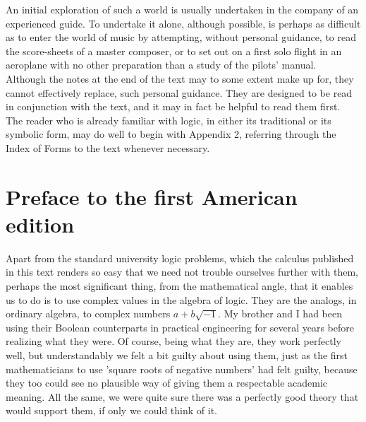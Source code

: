 \documentclass[a4paper]{article}
\theoremstyle{remark}
\begin{document}
An  initial  exploration  of  such  a  world  is  usually  undertaken  in the company  of an  experienced  guide. To  undertake  it  alone, although  possible,  is perhaps as  difficult  as to enter  the world  of  music  by  attempting,  without  personal  guidance,  to  read  the  score-sheets  of  a master  composer,  or  to  set  out  on  a  first  solo  flight  in  an  aeroplane  with  no  other  preparation  than  a  study  of  the  pilots'  manual. \\

Although  the  notes  at  the  end  of the  text  may  to  some  extent  make  up for, they cannot effectively replace,   such   personal   guidance.  They  are  designed  to  be  read  in  conjunction  with  the  text,  and  it  may  in  fact  be  helpful  to  read  them  first. \\

The  reader  who  is  already  familiar  with  logic,  in  either  its  traditional   or  its  symbolic  form,   may  do   well  to   begin   with   Appendix  2,  referring  through  the  Index  of  Forms  to  the  text  whenever  necessary.  \\


\newpage
\section*{Preface to the first American edition}

Apart   from   the   standard   university   logic   problems,   which   the  calculus published  in  this  text  renders  so  easy  that  we  need  not   trouble   ourselves   further   with   them,   perhaps   the   most   significant  thing,  from  the  mathematical  angle,  that  it  enables  us  to  do  is to  use  complex  values  in  the  algebra  of  logic.  They  are  the   analogs,   in  ordinary   algebra,   to   complex   numbers   $a +b \sqrt{-1}$.   My  brother  and  I  had  been  using  their  Boolean  counterparts  in  practical  engineering  for  several  years   before   realizing what  they were.  Of  course,  being  what  they  are,  they  work  perfectly   well,  but  understandably   we  felt   a  bit   guilty   about  using them,  just  as the  first mathematicians  to  use  'square  roots  of  negative  numbers'  had   felt  guilty,  because  they   too   could  see  no  plausible  way  of  giving  them   a  respectable  academic  meaning.  All  the  same,  we  were  quite  sure  there  was  a  perfectly   good   theory   that  would   support   them,   if  only   we   could  think  of  it.\\
\end{document}
